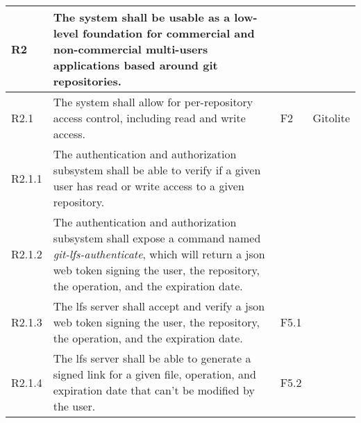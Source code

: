 \begin{landscape}
\begin{longtable}{|p{1cm}|p{19cm}|p{2cm}|p{3cm}|}
        \rowcolor[HTML]{C0C0C0}        R2         & The system shall be usable as a low-level foundation for commercial and non-commercial multi-users applications based around git repositories.                                                                                                                                        &                       &                                          \\ \hline
        \rowcolor[HTML]{DDFFDD}        R2.1       & The system shall allow for per-repository access control, including read and write access.                                                                                                                                                                                            & F2                    & Gitolite                                 \\ \hline
        \rowcolor[HTML]{EEFFEE}        R2.1.1     & The authentication and authorization subsystem shall be able to verify if a given user has read or write access to a given repository.                                                                                                                                                &                       &                                          \\ \hline
        \rowcolor[HTML]{EEFFEE}        R2.1.2     & The authentication and authorization subsystem shall expose a command named \textit{git-lfs-authenticate}, which will return a json web token signing the user, the repository, the operation, and the expiration date.                                                               &                       &                                          \\ \hline
        \rowcolor[HTML]{EEFFEE}        R2.1.3     & The lfs server shall accept and verify a json web token signing the user, the repository, the operation, and the expiration date.                                                                                                                                                     & F5.1                  &                                          \\ \hline
        \rowcolor[HTML]{EEFFEE}        R2.1.4     & The lfs server shall be able to generate a signed link for a given file, operation, and expiration date that can't be modified by the user.                                                                                                                                           & F5.2                  &                                          \\ \hline

\end{longtable}
\end{landscape}
